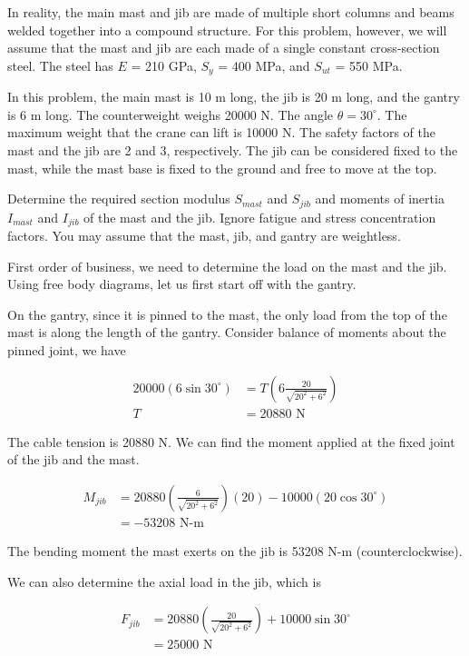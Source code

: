 \documentclass[a4paper,openany,nobib]{tufte-book}
\begin{document}
{{\begin{enumerate}
In reality, the main mast and jib are made of multiple short columns and
beams welded together into a compound structure. For this problem,
however, we will assume that the mast and jib are each made of a single
constant cross-section steel. The steel has \(E\) = 210 GPa, \(S_y\) = 400
MPa, and \(S_{ut}\) = 550 MPa.

In this problem, the main mast is 10 m long, the jib is 20 m long, and
the gantry is 6 m long. The counterweight weighs 20000 N. The angle
\(\theta = 30^{\circ}\). The maximum weight that the crane can lift is
10000 N. The safety factors of the mast and the jib are 2 and 3,
respectively. The jib can be considered fixed to the mast, while the
mast base is fixed to the ground and free to move at the top.

Determine the required section modulus \(S_{mast}\) and \(S_{jib}\) and
moments of inertia \(I_{mast}\) and \(I_{jib}\) of the mast and the jib.
Ignore fatigue and stress concentration factors. You may assume that the
mast, jib, and gantry are weightless.

First order of business, we need to determine the load on the mast and
the jib. Using free body diagrams, let us first start off with the
gantry.

On the gantry, since it is pinned to the mast, the only load from the
top of the mast is along the length of the gantry. Consider balance of
moments about the pinned joint, we have

$$\begin{aligned}
    20000(6 \sin 30^{\circ}) &= T \left( 6 \frac{20}{\sqrt{ 20^2 +6^2 }} \right) \\
    T &= 20880 \text{ N}
  \end{aligned}$$

The cable tension is 20880 N. We can find the moment applied at the
fixed joint of the jib and the mast.

$$\begin{aligned}
    M_{jib} &= 20880 \left( \frac{6}{\sqrt{20^2 + 6^2}} \right) (20) - 10000(20 \cos 30^{\circ}) \\
            &= -53208 \text{ N-m}
  \end{aligned}$$

The bending moment the mast exerts on the jib is 53208 N-m
(counterclockwise).

We can also determine the axial load in the jib, which is

$$\begin{aligned}
    F_{jib} &= 20880 \left( \frac{20}{\sqrt{20^2 + 6^2}} \right) + 10000 \sin 30^{\circ} \\
            &= 25000 \text{ N}
  \end{aligned}$$


\end{enumerate}}}
\end{document}
